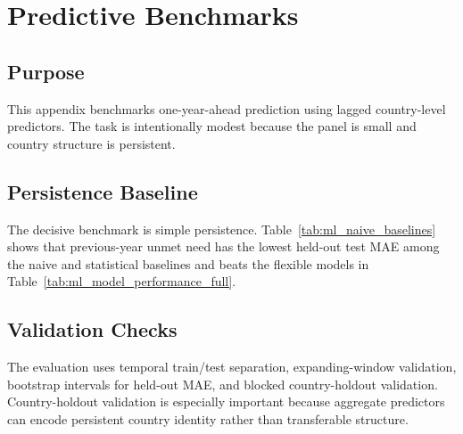 \chapter{Predictive Benchmarks}
\label{ch:ml_extension}

\section{Purpose}

This appendix benchmarks one-year-ahead prediction using lagged country-level predictors. The task is intentionally modest because the panel is small and country structure is persistent.

\section{Persistence Baseline}

The decisive benchmark is simple persistence. Table~\ref{tab:ml_naive_baselines} shows that previous-year unmet need has the lowest held-out test MAE among the naive and statistical baselines and beats the flexible models in Table~\ref{tab:ml_model_performance_full}.

\begin{table}[H]
\centering
\small
\caption{Naive and statistical baselines for one-year-ahead prediction. The held-out test set is the time-ordered 2021--2023 complete-case prediction sample; predictors use prior-year country information only.}
\label{tab:ml_naive_baselines}

\end{table}

\begin{table}[H]
\centering
\small
\caption{Linear and flexible benchmark performance with lagged predictors. Models are trained on the pre-test complete-case prediction panel and evaluated on the same 2021--2023 held-out test years as the naive baselines. Additional model-inspection tools are not used because the chapter is a negative benchmark, not an algorithmic contribution.}
\label{tab:ml_model_performance_full}

\end{table}

\section{Validation Checks}

The evaluation uses temporal train/test separation, expanding-window validation, bootstrap intervals for held-out MAE, and blocked country-holdout validation. Country-holdout validation is especially important because aggregate predictors can encode persistent country identity rather than transferable structure.

